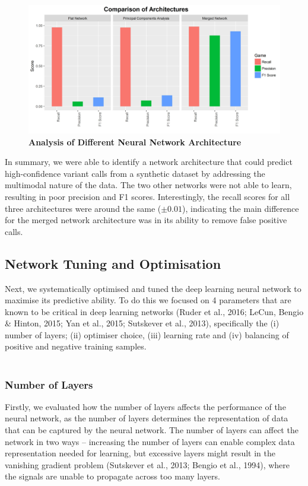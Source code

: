 \documentclass{article}
\begin{document}
\begin{figure}[H]
\includegraphics[width=\textwidth]{neuralnetworkstructureresults.jpg}
\centering
\caption{\textbf{Analysis of Different Neural Network Architecture}}
\end{figure}

In summary, we were able to identify a network architecture that could predict high-confidence variant calls from a synthetic dataset by addressing the multimodal nature of the data. The two other networks were not able to learn, resulting in poor precision and F1 scores. Interestingly, the recall scores for all three architectures were around the same ($\pm 0.01$), indicating the main difference for the merged network architecture was in its ability to remove false positive calls.

\subsection{Network Tuning and Optimisation}
Next, we systematically optimised and tuned the deep learning neural network to maximise its predictive ability. To do this we focused on 4 parameters that are known to be critical in deep learning networks (Ruder et al., 2016; LeCun, Bengio \& Hinton, 2015; Yan et al., 2015;  Sutskever et al., 2013), specifically the (i) number of layers; (ii) optimiser choice, (iii) learning rate and (iv) balancing of positive and negative training samples.\\\\
\subsubsection{Number of Layers}
Firstly, we evaluated how the number of layers affects the performance of the neural network, as the number of layers determines the representation of data that can be captured by the neural network. The number of layers can affect the network in two ways -- increasing the number of layers can enable complex data representation needed for learning, but excessive layers might result in the vanishing gradient problem (Sutskever et al., 2013; Bengio et al., 1994), where the signals are unable to propagate across too many layers.
\end{document}
